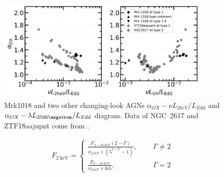 \begin{figure}
\centering
	\includegraphics[width=0.9\textwidth]{./pic/Mrk1018_subplots_plus_2individuals_alpha_ox_L_x_Luv_rate.png}
    \caption{Mrk1018 and two other changing-look AGNs $\alpha_{OX}-\nu L_{2keV}/L_{Edd}$ and $\alpha_{OX}-\lambda L_{2500 \angstrom}/L_{Edd}$ diagram. Data of NGC~2617 and ZTF18aajupnt come from \citet{2019arXiv190904676R}.  }
    \label{fig:alpha_ox_luv}
\end{figure}

\begin{eqnarray}
F_\mathrm{2~keV}= 
\begin{cases}\frac{F_{2-10~ keV} (2-\Gamma)}{\nu_{2~keV} \times (5^{2-\Gamma}-1)},\quad \ \ & 
  \Gamma \neq 2 \\ 
  \frac{F_{2-10~ keV}}{\nu_{2~keV} \times \mathrm{ln} 5}, \quad \ \ & \Gamma = 2
\end{cases} 
\end{eqnarray}




